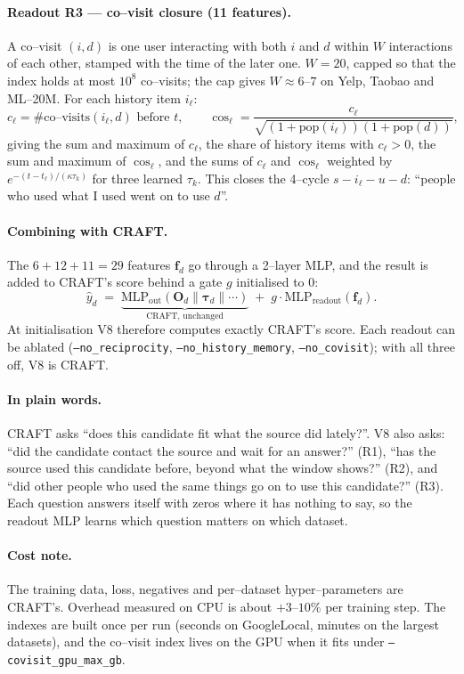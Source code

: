 \documentclass[11pt]{article}
\newcommand{\code}[1]{\texttt{\small #1}}
\newcommand{\concat}{\mathbin{\|}}       %
\begin{document}
\paragraph{Readout R3 --- co--visit closure (11 features).}
A co--visit $(i,d)$ is one user interacting with both $i$ and $d$ within $W$
interactions of each other, stamped with the time of the later one. $W=20$,
capped so that the index holds at most $10^8$ co--visits; the cap gives $W\approx6$--$7$
on Yelp, Taobao and ML--20M. For each history item $i_\ell$:
\[
  c_\ell = \#\text{co--visits}(i_\ell,d)\text{ before }t,
  \qquad
  \cos_\ell = \frac{c_\ell}{\sqrt{(1+\mathrm{pop}(i_\ell))(1+\mathrm{pop}(d))}},
\]
giving the sum and maximum of $c_\ell$, the share of history items with
$c_\ell>0$, the sum and maximum of $\cos_\ell$, and the sums of $c_\ell$ and
$\cos_\ell$ weighted by $e^{-(t-t_\ell)/(\kappa\tau_k)}$ for three learned
$\tau_k$. This closes the 4--cycle $s - i_\ell - u - d$: ``people who used what I
used went on to use $d$''.

\paragraph{Combining with CRAFT.}
The $6+12+11=29$ features $\bm{f}_d$ go through a 2--layer MLP, and the result is
added to CRAFT's score behind a gate $g$ initialised to $0$:
\[
  \hat{y}_d \;=\; \underbrace{\mathrm{MLP}_{\text{out}}(\bm{O}_d\concat\bm{\tau}_d\concat\cdots)}_{\text{CRAFT, unchanged}}
  \;+\; g\cdot \mathrm{MLP}_{\text{readout}}(\bm{f}_d).
\]
At initialisation V8 therefore computes exactly CRAFT's score. Each readout can be
ablated (\code{--no\_reciprocity}, \code{--no\_history\_memory},
\code{--no\_covisit}); with all three off, V8 is CRAFT.

\paragraph{In plain words.}
CRAFT asks ``does this candidate fit what the source did lately?''. V8 also asks:
``did the candidate contact the source and wait for an answer?'' (R1), ``has
the source used this candidate before, beyond what the window shows?'' (R2), and
``did other people who used the same things go on to use this candidate?'' (R3).
Each question answers itself with zeros where it has nothing to say, so the
readout MLP learns which question matters on which dataset.

\paragraph{Cost note.}
The training data, loss, negatives and per--dataset hyper--parameters are
CRAFT's. Overhead measured on CPU is about $+3$--$10\%$ per training step. The
indexes are built once per run (seconds on GoogleLocal, minutes on the largest
datasets), and the co--visit index lives on the GPU when it fits under
\code{--covisit\_gpu\_max\_gb}.
\end{document}

